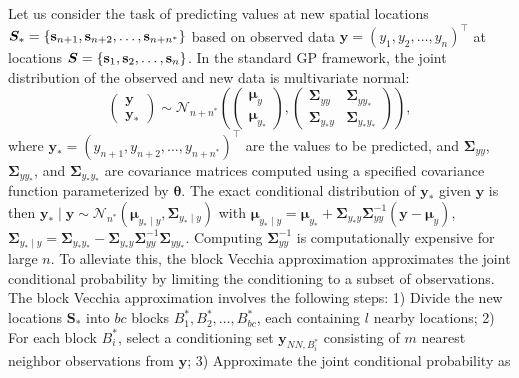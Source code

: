 \documentclass[12pt]{article}
\begin{document}
Let us consider the task of predicting values at new spatial locations $\boldsymbol{S}_* = \{ {\bf s}_{n+1}, {\bf s}_{n+2}, \ldots, {\bf s}_{n+n^*} \}$ based on observed data $\boldsymbol{y} = (y_1, y_2, \ldots, y_n)^\top$ at locations $\boldsymbol{S} = \{ {\bf s}_1, {\bf s}_2, \ldots, {\bf s}_n \}$. In the standard GP framework, the joint distribution of the observed and new data is multivariate normal:
\begin{equation*}
\begin{pmatrix}
\boldsymbol{y} \\
\boldsymbol{y}_*
\end{pmatrix}
\sim
\mathcal{N}_{n+n^*} \left(
\begin{pmatrix}
\boldsymbol{\mu}_y \\
\boldsymbol{\mu}_{y_*}
\end{pmatrix},
\begin{pmatrix}
\mathbf{\Sigma}_{yy} & \mathbf{\Sigma}_{y y_*} \\
\mathbf{\Sigma}_{y_* y} & \mathbf{\Sigma}_{y_* y_*}
\end{pmatrix}
\right),    
\end{equation*}
where $\boldsymbol{y}_* = (y_{n+1}, y_{n+2}, \ldots, y_{n+n^*})^\top$ are the values to be predicted, and $\mathbf{\Sigma}_{yy}$, $\mathbf{\Sigma}_{y y_*}$, and $\mathbf{\Sigma}_{y_* y_*}$ are covariance matrices computed using a specified covariance function parameterized by $\boldsymbol{\theta}$. The exact conditional distribution of $\boldsymbol{y}_*$ given $\boldsymbol{y}$ is then 
$ \boldsymbol{y}_* \mid \boldsymbol{y} \sim \mathcal{N}_{n^*} \left(
\boldsymbol{\mu}_{y_* \mid y}, \mathbf{\Sigma}_{y_* \mid y}\right)$
with
$
\boldsymbol{\mu}_{y_* \mid y} = \boldsymbol{\mu}_{y_*} + \mathbf{\Sigma}_{y_* y} \mathbf{\Sigma}_{yy}^{-1} (\boldsymbol{y} - \boldsymbol{\mu}_y)$, $\mathbf{\Sigma}_{y_* \mid y} = \mathbf{\Sigma}_{y_* y_*} - \mathbf{\Sigma}_{y_* y} \mathbf{\Sigma}_{yy}^{-1} \mathbf{\Sigma}_{y y_*}.
$
Computing $\mathbf{\Sigma}_{yy}^{-1}$ is computationally expensive for large $n$. To alleviate this, the block Vecchia approximation approximates the joint conditional probability by limiting the conditioning to a subset of observations. The block Vecchia approximation involves the following steps: 1) Divide the new locations $\boldsymbol{S}_*$ into $bc$ blocks $B^*_1, B^*_2, \ldots, B^*_{bc}$, each containing $l$ nearby locations; 2) For each block $B^*_i$, select a conditioning set $\boldsymbol{y}_{NN, B^*_i}$ consisting of $m$ nearest neighbor observations from $\boldsymbol{y}$; 3) Approximate the joint conditional probability as
\end{document}
